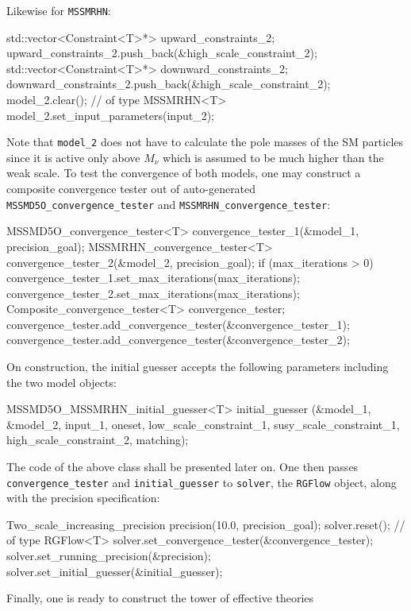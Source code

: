 \documentclass[final,3p,11pt,pdflatex]{elsarticle}
\newcommand{\code}[1]{\lstinline|#1|}  %
\begin{document}
Likewise for \code{MSSMRHN}:
\begin{numlstlisting}[name=SGrun,language=C++]
  std::vector<Constraint<T>*> upward_constraints_2;
  upward_constraints_2.push_back(&high_scale_constraint_2);
  std::vector<Constraint<T>*> downward_constraints_2;
  downward_constraints_2.push_back(&high_scale_constraint_2);
  model_2.clear();                 // of type MSSMRHN<T>
  model_2.set_input_parameters(input_2);
\end{numlstlisting}
Note that \code{model_2} does not have to calculate the pole masses of
the SM particles since it is active only above $M_\nu$
which is assumed to be much higher than the weak scale.
To test the convergence of both models,
one may construct a composite convergence tester
out of auto-generated
\code{MSSMD5O_convergence_tester} and \code{MSSMRHN_convergence_tester}:
\begin{numlstlisting}[name=SGrun]
  MSSMD5O_convergence_tester<T> convergence_tester_1(&model_1, precision_goal);
  MSSMRHN_convergence_tester<T> convergence_tester_2(&model_2, precision_goal);
  if (max_iterations > 0) {
    convergence_tester_1.set_max_iterations(max_iterations);
    convergence_tester_2.set_max_iterations(max_iterations);
  }
  Composite_convergence_tester<T> convergence_tester;
  convergence_tester.add_convergence_tester(&convergence_tester_1);
  convergence_tester.add_convergence_tester(&convergence_tester_2);
\end{numlstlisting}
On construction,
the initial guesser accepts the following parameters
including the two model objects:
\begin{numlstlisting}[name=SGrun]
  MSSMD5O_MSSMRHN_initial_guesser<T> initial_guesser
    (&model_1, &model_2, input_1, oneset,
     low_scale_constraint_1, susy_scale_constraint_1, high_scale_constraint_2,
     matching);
\end{numlstlisting}
The code of the above class shall be presented later on.
One then passes
\code{convergence_tester} and \code{initial_guesser}
to \code{solver}, the \code{RGFlow} object,
along with the precision specification:
\begin{numlstlisting}[name=SGrun,language=C++]
  Two_scale_increasing_precision precision(10.0, precision_goal);
  solver.reset();                  // of type RGFlow<T>
  solver.set_convergence_tester(&convergence_tester);
  solver.set_running_precision(&precision);
  solver.set_initial_guesser(&initial_guesser);
\end{numlstlisting}
Finally,
one is ready to construct the tower of effective theories
\end{document}
